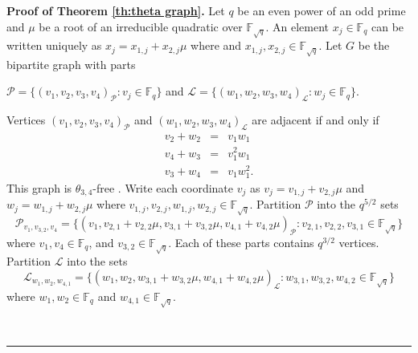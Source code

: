 \documentclass[12pt]{article}%
\newenvironment{proof}[1][Proof]{\noindent\textbf{#1.} }
{\hfill \ \rule{0.5em}{0.5em}}
\begin{document}
\medskip

\begin{proof}[Proof of Theorem \ref{th:theta graph}]
Let $q$ be an even power of an odd prime and 
$\mu$ be a root of an irreducible quadratic 
over $\mathbb{F}_{ \sqrt{q}}$.  
An element $x_j \in \mathbb{F}_q$ can be written uniquely
as $x_j = x_{1,j} + x_{2,j} \mu$ where and $x_{1,j}, x_{2,j} \in \mathbb{F}_{ \sqrt{q}}$.  
Let $G$ be the bipartite graph with 
parts 
\begin{center}
	$\mathcal{P} = \{ (v_1,v_2,v_3,v_4)_{ \mathcal{P} } : v_j \in \mathbb{F}_q \}$ 
	and 
	$\mathcal{L} = \{ ( w_1 , w_2, w_3 , w_4)_{ \mathcal{L} } 
	: w_j \in \mathbb{F}_q \}$.  
	\end{center}
	Vertices $(v_1,v_2,v_3,v_4)_{ \mathcal{P} }$ and 
$(w_1, w_2, w_3, w_4)_{ \mathcal{L} }$ are adjacent if and only if  
\begin{eqnarray*}
	v_2 + w_2 &  = & v_1 w_1 \\
	v_4 + w_3 & = & v_1^2 w_1 \\
	v_3 + w_4  & = & v_1 w_1^2.
\end{eqnarray*}
This graph is $\theta_{3,4}$-free \cite{VerWilliford}.  
Write each coordinate $v_j$ as $v_j = v_{1,j} + v_{2,j} \mu$ and $w_j = w_{1,j} + w_{2,j} \mu$ 
where $v_{1,j},v_{2,j},w_{1,j},w_{2,j} \in \mathbb{F}_{ \sqrt{q}}$.  
Partition $\mathcal{P}$ into the $q^{5/2}$ sets 
\[ \mathcal{P}_{ v_1 , v_{3,2} , v_4 }
	=
	\{ ( v_1 , v_{2,1} + v_{2,2} \mu , v_{3,1} + v_{3,2} \mu , 
	v_{4,1} + v_{4,2} \mu )_{ \mathcal{P} } : v_{2,1} , v_{2,2} , v_{3,1} \in 
	\mathbb{F}_{ \sqrt{q} } \}
	\]
where $v_1, v_4 \in \mathbb{F}_q$, and $ v_{3,2}  \in 
\mathbb{F}_{ \sqrt{q} }$.  Each of these parts contains $q^{3/2}$ vertices.   
Partition $\mathcal{L}$ into the sets
\[
\mathcal{L}_{ w_1, w_2 , w_{4,1} } = 
\{ 
( w_1 , w_2 , w_{3,1} + w_{3,2} \mu , w_{4,1} + w_{4,2} \mu )_{ \mathcal{L} } 
: w_{3,1} , w_{3,2}, w_{4,2} \in \mathbb{F}_{ \sqrt{q} } \}
\]
where $w_1, w_2 \in \mathbb{F}_q$ and $w_{4,1} \in \mathbb{F}_{ \sqrt{q} }$.  


\end{proof}
\end{document}
